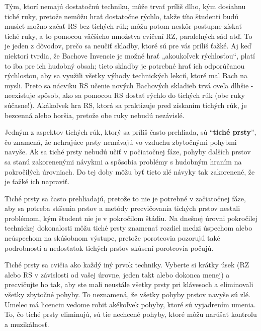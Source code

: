 \documentclass[11pt,a4paper]{book}
\begin{document}
Tým, ktorí nemajú dostatočnú techniku, môže trvať príliš dlho, kým dosiahnu tiché ruky, pretože nemôžu hrať dostatočne rýchlo, takže títo študenti budú musieť možno začať RS bez tichých rúk; môžu potom neskôr postupne získať tiché ruky, a to pomocou väčšieho množstva cvičení RZ, paralelných sád atď. To je jeden z dôvodov, prečo sa neučiť skladby, ktoré sú pre vás príliš ťažké. Aj keď niektorí tvrdia, že Bachove Invencie je možné hrať „akoukoľvek rýchlosťou“, platí to iba pre ich hudobný obsah; tieto skladby je potrebné hrať ich odporúčanou rýchlosťou, aby sa využili všetky výhody technických lekcií, ktoré mal Bach na mysli. Preto sa nácviku RS učenie nových Bachových skladieb trvá oveľa dlhšie - neexistuje spôsob, ako sa pomocou RS dostať rýchlo do tichých rúk (obe ruky súčasne!). Akákoľvek hra RS, ktorá sa praktizuje pred získaním tichých rúk, je bezcenná alebo horšia, pretože obe ruky nebudú nezávislé.

Jedným z aspektov tichých rúk, ktorý sa príliš často prehliada, sú “\textbf{tiché prsty}”, čo znamená, že nehrajúce prsty nemávajú vo vzduchu zbytočnými pohybmi navyše. Ak sa tiché prsty nebudú učiť v počiatočnej fáze, pohyby ďalších prstov sa stanú zakorenenými návykmi a spôsobia problémy s hudobným hraním na pokročilých úrovniach. Do tej doby môžu byť tieto zlé návyky tak zakorenené, že je ťažké ich napraviť.  

Tiché prsty sa často prehliadajú, pretože to nie je potrebné v začiatočnej fáze, aby sa potreba stíšenia prstov a metódy precvičovania tichých prstov nestali problémom, kým študent nie je v pokročilom štádiu. Na dnešnej úrovni pokročilej technickej dokonalosti môžu tiché prsty znamenať rozdiel medzi úspechom alebo neúspechom na skúšobnom výstupe, pretože porotcovia pozorujú také podrobnosti a nedostatok tichých prstov skúsení porotcovia počujú.

Tiché prsty sa cvičia ako každý iný prvok techniky. Vyberte si krátky úsek (RZ alebo RS v závislosti od vašej úrovne, jeden takt alebo dokonca menej) a precvičujte ho tak, aby ste mali neustále všetky prsty pri klávesoch a eliminovali všetky zbytočné pohyby. To neznamená, že všetky pohyby prstov navyše sú zlé. Umelec má licenciu vedome robiť akékoľvek pohyby, ktoré sú vyjadrením umenia. To, čo tiché prsty eliminujú, sú tie nechcené pohyby, ktoré môžu narúšať kontrolu a muzikálnosť.
\end{document}

